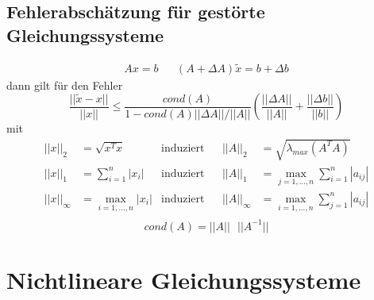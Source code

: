 \documentclass[
ngerman,
accentcolor=9c,%
type=intern,
marginpar=false
]{tudapub}
\begin{document}
        \subsection{Fehlerabschätzung für gestörte Gleichungssysteme}
            \begin{align*}
                Ax = b && (A+ \Delta A)\tilde{x} = b + \Delta b
            \end{align*}
            dann gilt für den Fehler
            \begin{equation*}
                \dfrac{||\tilde{x} - x||}{||x||} \leq \dfrac{cond(A)}{1-cond(A)||\Delta A|| / ||A||} \left(\dfrac{||\Delta A||}{||A||} + \dfrac{|| \Delta b||}{||b||}\right)
            \end{equation*}
            mit
            \begin{align*}
                ||x||_2 &= \sqrt{x^Tx} & \text{induziert} &&||A||_2 &= \sqrt{\lambda_{max}(A^TA)}\\
                ||x||_1 &= \sum^n_{i=1}|x_i| & \text{induziert} && ||A||_1 &= \max_{j=1,\dots,n} \sum^n_{i=1} |a_{ij}| \tag*{(Spaltensummen Norm = ``größte'' Spalte)}\\
                ||x||_\infty &= \max_{i=1,\dots,n}|x_i| & \text{induziert} && ||A||_\infty &= \max_{i=1,\dots,n} \sum^n_{j=1} |a_{ij}| \tag*{(Zeilensummen Norm = ``größte'' Zeile)}\\
            \end{align*}
            \begin{equation*}
                cond(A) = ||A||\mbox{ }||A^{-1}||
            \end{equation*}

    \newpage
    \section{Nichtlineare Gleichungssysteme}
\end{document}
